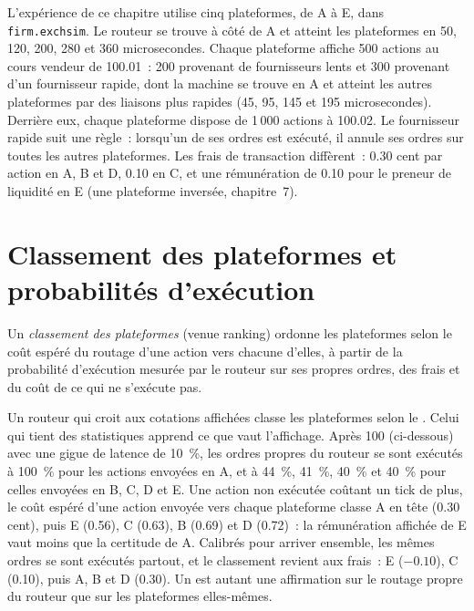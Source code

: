 L'expérience de ce chapitre utilise cinq plateformes, de A à E, dans \texttt{firm.exchsim}. Le routeur se trouve à côté de A et atteint les plateformes en 50, 120, 200,
280 et 360 microsecondes. Chaque plateforme affiche 500 actions au cours vendeur de 100.01~: 200 provenant de fournisseurs lents et 300 provenant d'un fournisseur rapide, dont la machine se trouve
en A et atteint les autres plateformes par des liaisons plus rapides (45, 95, 145 et 195 microsecondes). Derrière eux, chaque plateforme dispose de 1\,000 actions à 100.02. Le
fournisseur rapide suit une règle~: lorsqu'un de ses ordres est exécuté, il annule ses ordres sur toutes les autres plateformes. Les frais de transaction diffèrent~: 0.30 cent par action en A,
B et D, 0.10 en C, et une rémunération de 0.10 pour le preneur de liquidité en E (une plateforme inversée, chapitre~7).

\section{Classement des plateformes et probabilités d'exécution}

\begin{definition}\label{def:mx:smart-order-routing:ranking}
Un \emph{classement des plateformes} (venue ranking) ordonne les plateformes selon le coût espéré du routage d'une action vers chacune d'elles, à partir de la probabilité d'exécution
mesurée par le routeur sur ses propres ordres, des frais et du coût de ce qui ne s'exécute pas.
\end{definition}

Un routeur qui croit aux cotations affichées classe les plateformes selon le . Celui qui tient des statistiques apprend ce que vaut l'affichage. Après 100
 (ci-dessous) avec une gigue de latence de 10~\%, les ordres propres du routeur se sont exécutés à 100~\% pour les actions envoyées en A, et à 44~\%, 41~\%, 40~\% et 40~\% pour celles envoyées en
B, C, D et E. Une action non exécutée coûtant un tick de plus, le coût espéré d'une action envoyée vers chaque plateforme classe A en tête (0.30 cent), puis E (0.56),
C (0.63), B (0.69) et D (0.72)~: la rémunération affichée de E vaut moins que la certitude de A. Calibrés pour arriver ensemble, les mêmes ordres se sont exécutés
partout, et le classement revient aux frais~: E ($-0.10$), C (0.10), puis A, B et D (0.30). Un  est autant une affirmation sur le
routage propre du routeur que sur les plateformes elles-mêmes.

